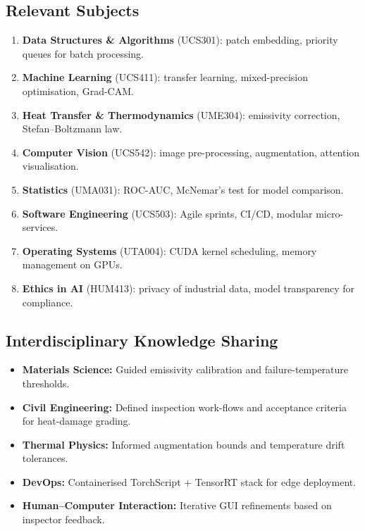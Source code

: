 \subsection{Relevant Subjects}
\begin{enumerate}
    \item \textbf{Data Structures \& Algorithms} (UCS301): patch embedding, priority queues for batch processing.
    \item \textbf{Machine Learning} (UCS411): transfer learning, mixed-precision optimisation, Grad-CAM.
    \item \textbf{Heat Transfer \& Thermodynamics} (UME304): emissivity correction, Stefan–Boltzmann law.
    \item \textbf{Computer Vision} (UCS542): image pre-processing, augmentation, attention visualisation.
    \item \textbf{Statistics} (UMA031): ROC-AUC, McNemar’s test for model comparison.
    \item \textbf{Software Engineering} (UCS503): Agile sprints, CI/CD, modular micro-services.
    \item \textbf{Operating Systems} (UTA004): CUDA kernel scheduling, memory management on GPUs.
    \item \textbf{Ethics in AI} (HUM413): privacy of industrial data, model transparency for compliance.
\end{enumerate}

\subsection{Interdisciplinary Knowledge Sharing}
\begin{itemize}
    \item \textbf{Materials Science:} Guided emissivity calibration and failure-temperature thresholds.
    \item \textbf{Civil Engineering:} Defined inspection work-flows and acceptance criteria for heat-damage grading.
    \item \textbf{Thermal Physics:} Informed augmentation bounds and temperature drift tolerances.
    \item \textbf{DevOps:} Containerised TorchScript + TensorRT stack for edge deployment.
    \item \textbf{Human–Computer Interaction:} Iterative GUI refinements based on inspector feedback.
\end{itemize}

